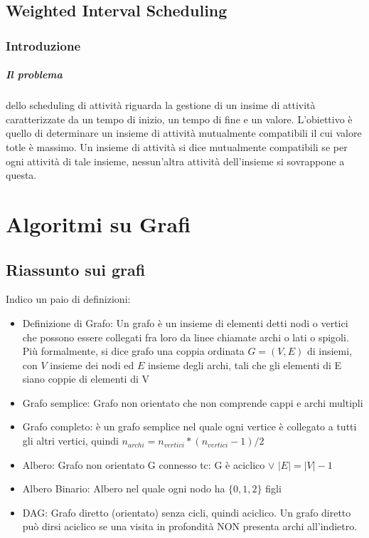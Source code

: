 \documentclass[12pt, a4paper, openany]{book}
\begin{document}
\section{Weighted Interval Scheduling}
\subsection{Introduzione}
\paragraph{Il problema} dello scheduling di attività riguarda la gestione di un insime di attività caratterizzate da un tempo di inizio, un tempo di fine e un valore. L'obiettivo è quello di determinare un insieme di attività mutualmente compatibili il cui valore totle è massimo. Un insieme di attività si dice mutualmente compatibili se per ogni attività di tale insieme, nessun'altra attività dell'insieme si sovrappone a questa.

\chapter{Algoritmi su Grafi}
\section{Riassunto sui grafi}
Indico un paio di definizioni:
\begin{itemize}
    \item Definizione di Grafo: Un grafo è un insieme di elementi detti nodi o vertici che possono essere collegati fra loro da linee chiamate archi o lati o spigoli. Più formalmente, si dice grafo una coppia ordinata $G=(V,E)$ di insiemi, con $V$ insieme dei nodi ed $E$ insieme degli archi, tali che gli elementi di E siano coppie di elementi di V
    \item Grafo semplice: Grafo non orientato che non comprende cappi e archi multipli
    \item Grafo completo: è un grafo semplice nel quale ogni vertice è collegato a tutti gli altri vertici, quindi $n_{archi} = n_{vertici} * (n_{vertici} - 1)/2$
    \item Albero: Grafo non orientato G connesso tc: G è aciclico $\lor$ $|E| = |V| - 1$
    \item Albero Binario: Albero nel quale ogni nodo ha $\{0,1,2\}$ figli
    \item DAG: Grafo diretto (orientato) senza cicli, quindi aciclico. Un grafo diretto può dirsi aciclico se una visita in profondità NON presenta archi all'indietro.
\end{itemize}
\end{document}

